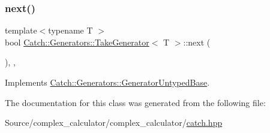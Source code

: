 \mbox{\label{class_catch_1_1_generators_1_1_take_generator_ae343f3e28fe04e0a20d6fdf69bfb4c78}} 
\subsubsection{\texorpdfstring{next()}{next()}}
{\footnotesize\ttfamily template$<$typename T $>$ \\
bool \mbox{\hyperlink{class_catch_1_1_generators_1_1_take_generator}{Catch\+::\+Generators\+::\+Take\+Generator}}$<$ T $>$\+::next (\begin{DoxyParamCaption}{ }\end{DoxyParamCaption})\hspace{0.3cm}{\ttfamily [inline]}, {\ttfamily [override]}, {\ttfamily [virtual]}}



Implements \mbox{\hyperlink{class_catch_1_1_generators_1_1_generator_untyped_base_aeed3c0cd6233c5f553549e453b8d6638}{Catch\+::\+Generators\+::\+Generator\+Untyped\+Base}}.



The documentation for this class was generated from the following file\+:\begin{DoxyCompactItemize}
\item 
Source/complex\+\_\+calculator/complex\+\_\+calculator/\mbox{\hyperlink{catch_8hpp}{catch.\+hpp}}\end{DoxyCompactItemize}
